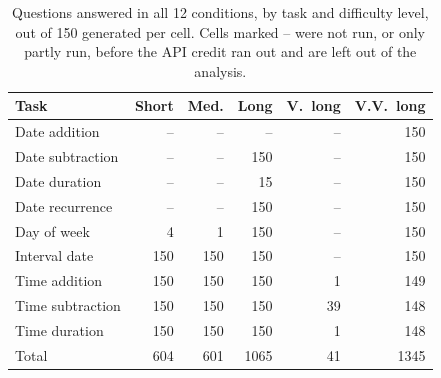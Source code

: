 \begin{table}[t]
\centering
\small
\setlength{\tabcolsep}{3.5pt}
\begin{tabular}{@{}lrrrrr@{}}
\toprule
Task & Short & Med. & Long & V.\ long & V.V.\ long \\
\midrule
Date addition & -- & -- & -- & -- & 150 \\
Date subtraction & -- & -- & 150 & -- & 150 \\
Date duration & -- & -- & 15 & -- & 150 \\
Date recurrence & -- & -- & 150 & -- & 150 \\
Day of week & 4 & 1 & 150 & -- & 150 \\
Interval date & 150 & 150 & 150 & -- & 150 \\
Time addition & 150 & 150 & 150 & 1 & 149 \\
Time subtraction & 150 & 150 & 150 & 39 & 148 \\
Time duration & 150 & 150 & 150 & 1 & 148 \\
\midrule
Total & 604 & 601 & 1065 & 41 & 1345 \\
\bottomrule
\end{tabular}
\caption{Questions answered in all 12 conditions, by task and difficulty level, out of 150 generated per cell. Cells marked -- were not run, or only partly run, before the API credit ran out and are left out of the analysis.}
\label{tab:coverage}
\end{table}

